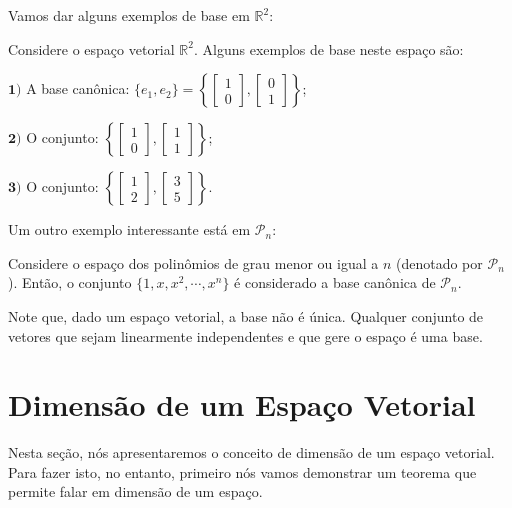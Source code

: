 Vamos dar alguns exemplos de base em $\mathbb{R}^2$:

\begin{Example}
	Considere o espaço vetorial $\mathbb{R}^2$. Alguns exemplos de base neste espaço são:
	
	$\mathbf{1)}$ A base canônica: $\{e_1, e_2\} = \left\{\begin{bmatrix}
		1 \\
		0
	\end{bmatrix}, \begin{bmatrix}
		0 \\
		1
	\end{bmatrix}\right\}$;
	
	$\mathbf{2)}$ O conjunto: $\left\{\begin{bmatrix}
		1 \\
		0
	\end{bmatrix}, \begin{bmatrix}
		1 \\
		1
	\end{bmatrix}\right\}$;
	
	$\mathbf{3)}$ O conjunto: $\left\{\begin{bmatrix}
		1 \\
		2
	\end{bmatrix}, \begin{bmatrix}
		3 \\
		5
	\end{bmatrix}\right\}$.
\end{Example}

Um outro exemplo interessante está em $\mathcal{P}_n$:

\begin{Example}
	Considere o espaço dos polinômios de grau menor ou igual a $n$ (denotado por $\mathcal{P}_n$). Então, o conjunto $\{1, x, x^2, \cdots, x^n\}$ é considerado a base canônica de $\mathcal{P}_n$.
\end{Example}

Note que, dado um espaço vetorial, a base não é única. Qualquer conjunto de vetores que sejam linearmente independentes e que gere o espaço é uma base.

\section{Dimensão de um Espaço Vetorial}

Nesta seção, nós apresentaremos o conceito de dimensão de um espaço vetorial. Para fazer isto, no entanto, primeiro nós vamos demonstrar um teorema que permite falar em dimensão de um espaço.

